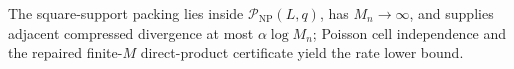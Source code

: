 The square-support packing lies inside \(\mathcal P_{\mathrm{NP}}(L,q)\), has \(M_n\to\infty\), and supplies adjacent compressed divergence at most \(\alpha\log M_n\); Poisson cell independence and the repaired finite-\(M\) direct-product certificate yield the rate lower bound.